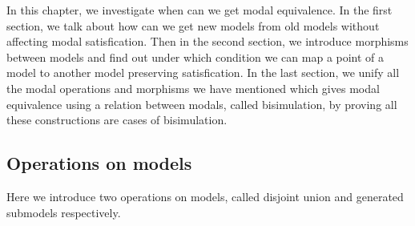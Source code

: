 \documentclass[letterpaper]{article}
\begin{document}
In this chapter, we investigate when can we get modal equivalence. In the first section, we talk about how can we get new models from old models without affecting modal satisfication. Then in the second section, we introduce morphisms between models and find out under which condition we can map a point of a model to another model preserving satisfication. In the last section, we unify all the modal operations and morphisms we have mentioned which gives modal equivalence using a relation between modals, called bisimulation, by proving all these constructions are cases of bisimulation.


\subsection{Operations on models}

Here we introduce two operations on models, called disjoint union and generated submodels respectively. 
\end{document}
